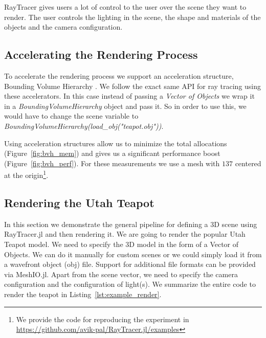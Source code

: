 \documentclass{juliacon}
\begin{document}
RayTracer gives users a lot of control to the user over the scene they want to render. The user controls the lighting in the scene, the shape and materials of the objects and the camera configuration.

\subsection{Accelerating the Rendering Process}

To accelerate the rendering process we support an acceleration structure, Bounding Volume Hierarchy \cite{Kay:1986:RTC:15922.15916}. We follow the exact same API for ray tracing using these accelerators. In this case instead of passing a \textit{Vector of Objects} we wrap it in a \textit{BoundingVolumeHierarchy} object and pass it. So in order to use this, we would have to change the scene variable to \textit{BoundingVolumeHierarchy(load\_obj("teapot.obj"))}.

Using acceleration structures allow us to minimize the total allocations (Figure~\ref{fig:bvh_mem}) and gives us a significant performance boost (Figure~\ref{fig:bvh_perf}). For these measurements we use a mesh with $137$ centered at the origin\footnote{We provide the code for reproducing the experiment in \href{https://github.com/avik-pal/RayTracer.jl/examples}{https://github.com/avik-pal/RayTracer.jl/examples}}.

\subsection{Rendering the Utah Teapot}

In this section we demonstrate the general pipeline for defining a 3D scene using RayTracer.jl and then rendering it. We are going to render the popular Utah Teapot model. We need to specify the 3D model in the form of a Vector of Objects. We can do it manually for custom scenes or we could simply load it from a wavefront object (obj) file. Support for additional file formats can be provided via MeshIO.jl. Apart from the scene vector, we need to specify the camera configuration and the configuration of light(s). We summarize the entire code to render the teapot in Listing~\ref{lst:example_render}. 
\end{document}
